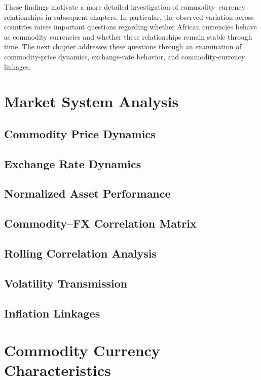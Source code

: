 \documentclass{article}
\begin{document}
These findings motivate a more detailed investigation of commodity--currency relationships in subsequent chapters. In particular, the observed variation across countries raises important questions regarding whether African currencies behave as commodity currencies and whether these relationships remain stable through time. The next chapter addresses these questions through an examination of commodity-price dynamics, exchange-rate behavior, and commodity-currency linkages.


\section{Market System Analysis}

\subsection{Commodity Price Dynamics}

\subsection{Exchange Rate Dynamics}

\subsection{Normalized Asset Performance}

\subsection{Commodity–FX Correlation Matrix}

\subsection{Rolling Correlation Analysis}

\subsection{Volatility Transmission}

\subsection{Inflation Linkages}

\section{Commodity Currency Characteristics}
\end{document}
